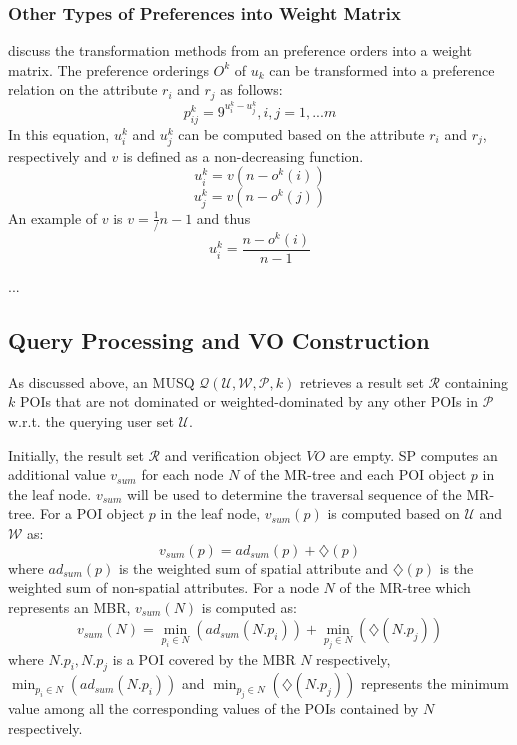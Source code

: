 \documentclass[10pt, conference, compsocconf]{IEEEtran}
\begin{document}
\subsubsection{Other Types of Preferences into Weight Matrix}
\cite{} discuss the transformation methods from an preference orders into a weight matrix.
The preference orderings $O^k$ of $u_k$ can be transformed into a preference relation on the attribute $r_i$ and $r_j$ as follows:
\[p^k_{ij} = 9^{u^k_i - u^k_j} , i,j = 1,...m\]
In this equation, $u^k_i$ and $u^k_j$ can be computed based on the attribute $r_i$ and $r_j$, respectively and $v$ is defined as a non-decreasing function.
\[u^k_i = v(n-o^k(i))\] 
\[u^k_j = v(n-o^k(j))\]
An example of $v$ is $v = \frac{1}/{n-1}$ and thus 
\[u^k_i = \frac{n-o^k(i)}{n-1}\]


...



\subsection{Query Processing and VO Construction}\label{processing}

As discussed above, an MUSQ $\mathcal{Q}(\mathcal{U}, \mathcal{W}, \mathcal{P}, k)$ retrieves a result set $\mathcal{R}$ containing $k$ POIs that are not dominated or weighted-dominated by any other POIs in $\mathcal{P}$ w.r.t. the querying user set $\mathcal{U}$.

Initially, the result set $\mathcal{R}$ and verification object $VO$ are empty. SP computes an additional value $v_{sum}$ for each node $N$ of the MR-tree and each POI object $p$ in the leaf node. $v_{sum}$ will be used to determine the traversal sequence of the MR-tree. For a POI object $p$ in the leaf node, $v_{sum}(p)$ is computed based on $\mathcal{U}$ and $\mathcal{W}$ as:
\begin{equation*}
    v_{sum}(p) = ad_{sum}(p) + \diamondsuit(p)
\end{equation*}
where $ad_{sum}(p)$ is the weighted sum of spatial attribute and $\diamondsuit(p)$ is the weighted sum of non-spatial attributes.
For a node $N$ of the MR-tree which represents an MBR, $v_{sum}(N)$ is computed as:
\begin{equation*}
    v_{sum}(N) = \min_{p_i \in N}(ad_{sum}(N.p_i)) + \min_{p_j \in N}(\diamondsuit(N.p_j))
\end{equation*}
where $N.p_i, N.p_j$ is a POI covered by the MBR $N$ respectively, $\min_{p_i \in N}(ad_{sum}(N.p_i))$ and $\min_{p_j \in N}(\diamondsuit(N.p_j))$ represents the minimum value among all the corresponding values of the POIs contained by $N$ respectively. 
\end{document}
